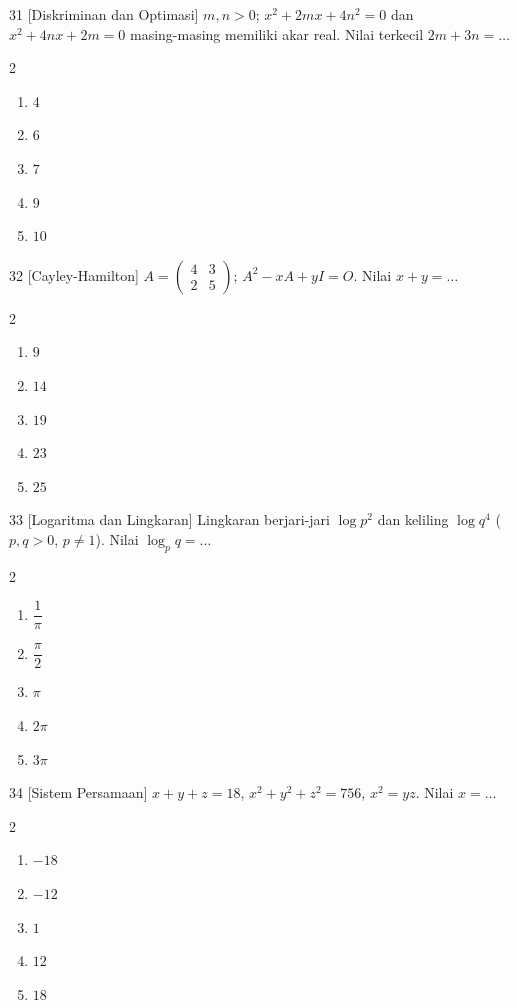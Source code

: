 \documentclass[11pt]{article}
\newenvironment{pilB}{%
  \par\smallskip\begin{multicols}{2}
  \begin{enumerate}[label=(\alph*),leftmargin=*,itemsep=1pt,topsep=3pt]}%
  {\end{enumerate}\end{multicols}}
\begin{document}
\begin{soal}{31 \normalfont\small[Diskriminan dan Optimasi]}
$m,n>0$; $x^2+2mx+4n^2=0$ dan $x^2+4nx+2m=0$ masing-masing memiliki akar real.
Nilai terkecil $2m+3n=\ldots$
\begin{pilB}
  \item $4$ \item $6$ \item $7$ \item $9$ \item $10$
\end{pilB}
\end{soal}

\begin{soal}{32 \normalfont\small[Cayley-Hamilton]}
$A=\begin{pmatrix}4&3\\2&5\end{pmatrix}$; $A^2-xA+yI=O$. Nilai $x+y=\ldots$
\begin{pilB}
  \item $9$ \item $14$ \item $19$ \item $23$ \item $25$
\end{pilB}
\end{soal}

\begin{soal}{33 \normalfont\small[Logaritma dan Lingkaran]}
Lingkaran berjari-jari $\log p^2$ dan keliling $\log q^4$ ($p,q>0$, $p\neq1$). Nilai $\log_p q=\ldots$
\begin{pilB}
  \item $\dfrac1\pi$ \item $\dfrac\pi2$ \item $\pi$ \item $2\pi$ \item $3\pi$
\end{pilB}
\end{soal}

\begin{soal}{34 \normalfont\small[Sistem Persamaan]}
$x+y+z=18$, $x^2+y^2+z^2=756$, $x^2=yz$. Nilai $x=\ldots$
\begin{pilB}
  \item $-18$ \item $-12$ \item $1$ \item $12$ \item $18$
\end{pilB}
\end{soal}
\end{document}

